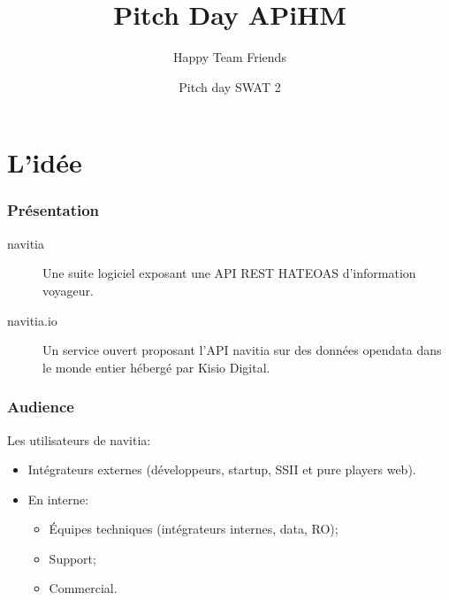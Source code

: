 \documentclass[table]{beamer}
\title{Pitch Day APiHM}
\author{Happy Team Friends}
\institute[Kisio Digital] %
{
  Kisio Digital\\
  20 rue Hector Malot\\
  75012 Paris, France}
\date{Pitch day SWAT 2}
\begin{document}
\begin{frame}
  \titlepage
\end{frame}

\section{L'idée}

\begin{frame}
  \frametitle{Présentation}

  \begin{description}
  \item[navitia] Une suite logiciel exposant une API REST HATEOAS d'information voyageur.
  \item[navitia.io] Un service ouvert proposant l'API navitia sur des
    données opendata dans le monde entier hébergé par Kisio Digital.
  \end{description}
\end{frame}

\begin{frame}
  \frametitle{Audience}

  Les utilisateurs de navitia:
  \begin{itemize}
  \item Intégrateurs externes (développeurs, startup, SSII et pure
    players web).
  \item En interne:
    \begin{itemize}
    \item Équipes techniques (intégrateurs internes, data, RO);
    \item Support;
    \item Commercial.
    \end{itemize}
  \end{itemize}
\end{frame}

\end{document}
